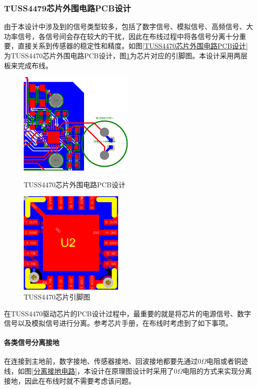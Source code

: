 	\subsubsection{TUSS4479芯片外围电路PCB设计}
    由于本设计中涉及到的信号类型较多，包括了数字信号、模拟信号、高频信号、大功率信号，各信号间会存在较大的干扰，因此在布线过程中将各信号分离十分重要，直接关系到传感器的稳定性和精度。如图\ref{TUSS4470芯片外围电路PCB设计}为TUSS4470芯片外围电路PCB设计，图\ref{TUSS4470芯片引脚图}为芯片对应的引脚图。本设计采用两层板来完成布线。
  \begin{figure}[!h]
   		\begin{minipage}[t]{0.5\linewidth}
  			\centering
  			\includegraphics[height=5cm]{figure/TUSS4470 pcb.png}
  			\caption{TUSS4470芯片外围电路PCB设计}
  			\label{TUSS4470芯片外围电路PCB设计}
  		\end{minipage}
   		\begin{minipage}[t]{0.5\linewidth}
  			\centering
  			\includegraphics[height=5cm]{figure/TUSS4470 PIN.png}
  			\caption{TUSS4470芯片引脚图}
  			\label{TUSS4470芯片引脚图}
  		\end{minipage}  		 
  \end{figure}\par
    在TUSS4470驱动芯片的PCB设计过程中，最重要的就是将芯片的电源信号、数字信号以及模拟信号进行分离。参考芯片手册，在布线时考虑到了如下事项。\par
    \paragraph{各类信号分离接地}
    在连接到主地前，数字接地、传感器接地、回波接地都要先通过0$\Omega$电阻或者铜迹线，如图\ref{分离接地电路}，本设计在原理图设计时采用了0$\Omega$电阻的方式来实现分离接地，因此在布线时就不需要考虑该问题。
